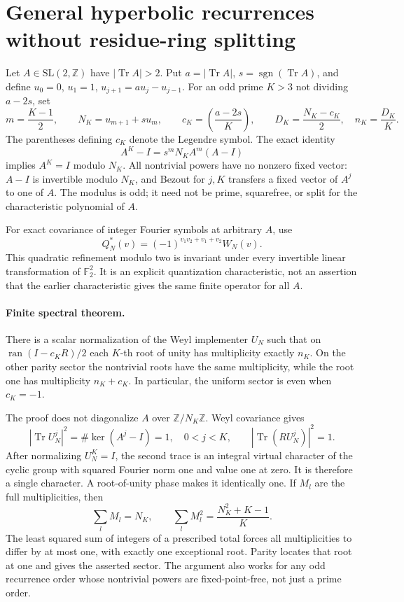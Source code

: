 \section{General hyperbolic recurrences without residue-ring splitting}

Let $A\in\mathrm{SL}(2,\mathbb Z)$ have $|\operatorname{Tr}A|>2$.
Put $a=|\operatorname{Tr}A|$, $s=\operatorname{sgn}(\operatorname{Tr}A)$,
and define $u_0=0$, $u_1=1$, $u_{j+1}=au_j-u_{j-1}$.
For an odd prime $K>3$ not dividing $a-2s$, set
\[
 m=\frac{K-1}{2},\qquad N_K=u_{m+1}+s u_m,\qquad
 c_K=\left(\frac{a-2s}{K}\right),\qquad
 D_K=\frac{N_K-c_K}{2},\quad n_K=\frac{D_K}{K}.
\]
The parentheses defining $c_K$ denote the Legendre symbol. The exact identity
\[
 A^K-I=s^mN_K A^m(A-I)
\]
implies $A^K=I$ modulo $N_K$. All nontrivial powers have no nonzero fixed
vector: $A-I$ is invertible modulo $N_K$, and Bezout for $j,K$ transfers a
fixed vector of $A^j$ to one of $A$. The modulus is odd; it need not be prime,
squarefree, or split for the characteristic polynomial of $A$.

For exact covariance of integer Fourier symbols at arbitrary $A$, use
\[
 Q_N^*(v)=(-1)^{v_1v_2+v_1+v_2}W_N(v).
\]
This quadratic refinement modulo two is invariant under every invertible
linear transformation of $\mathbb F_2^2$. It is an explicit quantization
characteristic, not an assertion that the earlier characteristic gives the
same finite operator for all $A$.

\paragraph{Finite spectral theorem.}
There is a scalar normalization of the Weyl implementer $U_N$ such that on
$\operatorname{ran}(I-c_KR)/2$ each $K$-th root of unity has multiplicity
exactly $n_K$. On the other parity sector the nontrivial roots have the same
multiplicity, while the root one has multiplicity $n_K+c_K$.
In particular, the uniform sector is even when $c_K=-1$.

The proof does not diagonalize $A$ over $\mathbb Z/N_K\mathbb Z$.
Weyl covariance gives
\[
 |\operatorname{Tr}U_N^j|^2=\#\ker(A^j-I)=1,\quad 0<j<K,
 \qquad |\operatorname{Tr}(RU_N^j)|^2=1.
\]
After normalizing $U_N^K=I$, the second trace is an integral virtual
character of the cyclic group with squared Fourier norm one and value one
at zero. It is therefore a single character. A root-of-unity phase makes
it identically one. If $M_l$ are the full multiplicities, then
\[
 \sum_l M_l=N_K,\qquad
 \sum_l M_l^2=\frac{N_K^2+K-1}{K}.
\]
The least squared sum of integers of a prescribed total forces all
multiplicities to differ by at most one, with exactly one exceptional root.
Parity locates that root at one and gives the asserted sector. The argument
also works for any odd recurrence order whose nontrivial powers are
fixed-point-free, not just a prime order.

